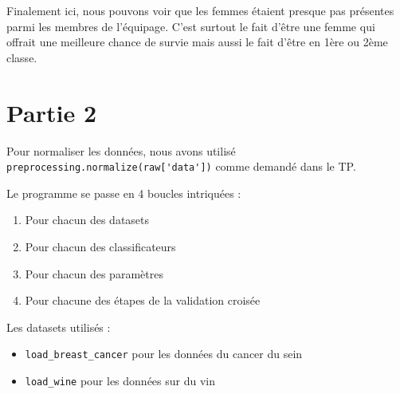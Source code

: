 \documentclass[a4paper,10pt]{article}
\begin{document}
        Finalement ici, nous pouvons voir que les femmes étaient presque pas présentes parmi les membres de l’équipage. C’est surtout le fait d’être une femme qui offrait une meilleure chance de survie mais aussi le fait d’être en 1ère ou 2ème classe. 
\section{Partie 2}
    Pour normaliser les données, nous avons utilisé \verb?preprocessing.normalize(raw['data'])? comme demandé dans le TP.
    
    Le programme se passe en 4 boucles intriquées :
    \begin{enumerate}
        \item Pour chacun des datasets
        \item Pour chacun des classificateurs
        \item Pour chacun des paramètres
        \item Pour chacune des étapes de la validation croisée
    \end{enumerate}
    
    Les datasets utilisés : 
    \begin{itemize}
        \item \verb?load_breast_cancer? pour les données du cancer du sein
        \item \verb?load_wine? pour les données sur du vin
    \end{itemize}
    
\end{document}
